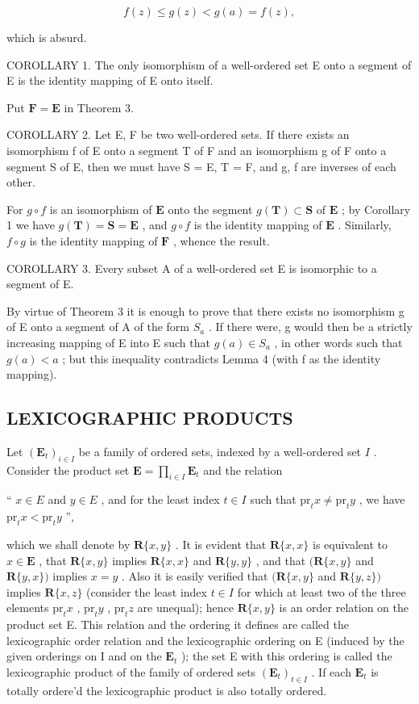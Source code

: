 \[
f (z) \leqslant g (z) <   g (a) = f (z),
\]

which is absurd.

COROLLARY 1. The only isomorphism of a well-ordered set E onto a segment of E is the identity mapping of E onto itself.

Put \(\mathbf{F} = \mathbf{E}\) in Theorem 3.

COROLLARY 2. Let E, F be two well-ordered sets. If there exists an isomorphism f of E onto a segment T of F and an isomorphism g of F onto a segment S of E, then we must have S = E, T = F, and g, f are inverses of each other.

For \(g \circ f\) is an isomorphism of \(\mathbf{E}\) onto the segment \(g(\mathbf{T}) \subset \mathbf{S}\) of \(\mathbf{E}\) ; by Corollary 1 we have \(g(\mathbf{T}) = \mathbf{S} = \mathbf{E}\) , and \(g \circ f\) is the identity mapping of \(\mathbf{E}\) . Similarly, \(f \circ g\) is the identity mapping of \(\mathbf{F}\) , whence the result.

COROLLARY 3. Every subset A of a well-ordered set E is isomorphic to a segment of E.

By virtue of Theorem 3 it is enough to prove that there exists no isomorphism g of E onto a segment of A of the form \(S_{a}\) . If there were, g would then be a strictly increasing mapping of E into E such that \(g(a) \in S_{a}\) , in other words such that \(g(a) < a\) ; but this inequality contradicts Lemma 4 (with f as the identity mapping).

\subsection{LEXICOGRAPHIC PRODUCTS}

Let \((\mathbf{E}_t)_{i\in I}\) be a family of ordered sets, indexed by a well-ordered set \(I\) . Consider the product set \(\mathbf{E} = \prod_{i\in I}\mathbf{E}_t\) and the relation

`` \(x \in E\) and \(y \in E\) , and for the least index \(t \in I\) such that \(\mathrm{pr}_t x \neq \mathrm{pr}_t y\) , we have \(\mathrm{pr}_t x < \mathrm{pr}_t y\) '',

which we shall denote by \(\mathbf{R}\{x, y\}\) . It is evident that \(\mathbf{R}\{x, x\}\) is equivalent to \(x \in \mathbf{E}\) , that \(\mathbf{R}\{x, y\}\) implies \(\mathbf{R}\{x, x\}\) and \(\mathbf{R}\{y, y\}\) , and that \((\mathbf{R}\{x, y\}\) and \(\mathbf{R}\{y, x\})\) implies \(x = y\) . Also it is easily verified that \((\mathbf{R}\{x, y\}\) and \(\mathbf{R}\{y, z\})\) implies \(\mathbf{R}\{x, z\}\) (consider the least index \(t \in I\) for which at least two of the three elements \(\mathrm{pr}_t x\) , \(\mathrm{pr}_t y\) , \(\mathrm{pr}_t z\) are unequal); hence \(\mathbf{R}\{x, y\}\) is an order relation on the product set E. This relation and the ordering it defines are called the lexicographic order relation and the lexicographic ordering on E (induced by the given orderings on I and on the \(\mathbf{E}_t\) ); the set E with this ordering is called the lexicographic product of the family of ordered sets \((\mathbf{E}_t)_{t \in I}\) . If each \(\mathbf{E}_t\) is totally ordere'd the lexicographic product is also totally ordered.

